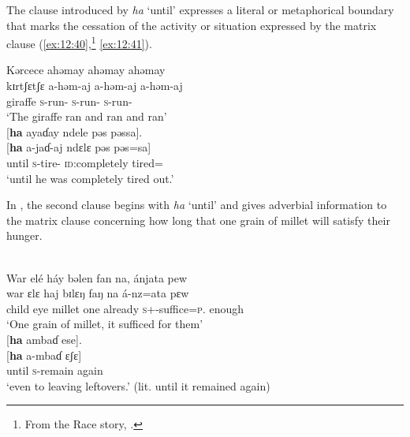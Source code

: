 The clause introduced by \textit{ha} ‘until’ expresses a literal or metaphorical boundary that marks the cessation of the activity or situation expressed by the matrix clause (\ref{ex:12:40},\footnote{From the Race story, \citealt{Friesen2003}.} \ref{ex:12:41}).

\clearpage
\ea \label{ex:12:40}
Kərcece  ahəmay  ahəmay  ahəmay\\ 
\gll  kɪrtʃɛtʃɛ a-həm-aj    a-həm-aj  a-həm-aj \\  
      giraffe  \textsc{s}-run-{\CL} \textsc{s}-run-{\CL} \textsc{s}-run-{\CL}\\  
\glt ‘The giraffe ran and ran and ran’\\

\medskip
{} [\textbf{ha}  ayaɗay  ndele  pəs  pəssa].\\
\gll {}[\textbf{ha}   a-jaɗ-aj     {ndɛlɛ pəs pəs}=sa]\\ 
     until  \textsc{s}-tire-{\CL}  {\textsc{id}:completely tired}={\ADV}\\
\glt  ‘until he was completely tired out.’ 
\z 

In , the second clause begins with \textit{ha} ‘until’ and gives adverbial information to the matrix clause concerning how long that one grain of millet will satisfy their hunger. 

\ea \label{ex:12:41}
\\
War  elé  háy  bəlen  fan  na,  ánjata  pew \\ 
\gll  war    ɛlɛ   haj   bɪlɛŋ   faŋ  na      á-nz=ata  pɛw \\     
      child     eye  millet  one  already  {\PSP}  \textsc{s}+{\IFV}-suffice=\textsc{p}.{\IO}  enough \\     
\glt ‘One grain of millet, it sufficed for them’\\

\medskip
{}[\textbf{ha}  ambaɗ  ese].\\
\gll {}[\textbf{ha} a-mbaɗ ɛʃɛ]\\
     until \textsc{s}-remain   again\\ 
\glt  ‘even to leaving leftovers.’ (lit. until it remained again)
\z 

